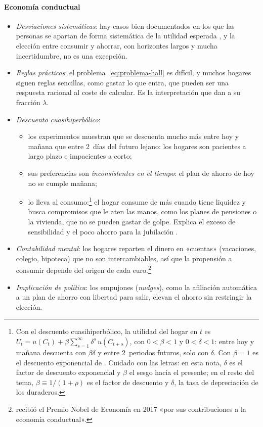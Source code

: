 \documentclass[11pt]{article}
\begin{document}
\paragraph{Economía conductual}

\begin{itemize}
\item \emph{Desviaciones sistemáticas}: hay casos bien documentados en los que las personas se apartan de forma sistemática de la utilidad esperada\nocite{KahnemanTversky1979Prospect} , y la elección entre consumir y ahorrar, con horizontes largos y mucha incertidumbre, no es una excepción.
\item \emph{Reglas prácticas}: el problema~\eqref{eq:problema-hall} es difícil, y muchos hogares siguen reglas sencillas, como gastar lo que entra, que pueden ser una respuesta racional al coste de calcular. Es la interpretación que dan \textcite{CampbellMankiw1989Consumption} a su fracción $\lambda$.
\item \emph{Descuento cuasihiperbólico}:
  \begin{itemize}
  \item los experimentos muestran que se descuenta mucho más entre hoy y mañana que entre 2~días del futuro lejano\nocite{Thaler1981Some}: los hogares son pacientes a largo plazo e impacientes a corto;
  \item sus preferencias son \emph{inconsistentes en el tiempo}\nocite{Strotz1955Myopia}: el plan de ahorro de hoy no se cumple mañana;
  \item \textcite{Laibson1997Golden} lo lleva al consumo:\footnote{Con el descuento cuasihiperbólico, la utilidad del hogar en $t$ es $U_t=u(C_t)+\beta\sum_{s=1}^{\infty}\delta^s\,u(C_{t+s})$, con $0<\beta<1$ y $0<\delta<1$: entre hoy y mañana descuenta con $\beta\delta$ y entre 2~periodos futuros, solo con $\delta$. Con $\beta=1$ es el descuento exponencial de \textcite{Samuelson1937Note}. Cuidado con las letras: en esta nota, $\delta$ es el factor de descuento exponencial y $\beta$ el sesgo hacia el presente; en el resto del tema, $\beta\equiv 1/(1+\rho)$ es el factor de descuento y $\delta$, la tasa de depreciación de los duraderos.} el hogar consume de más cuando tiene liquidez y busca compromisos que le aten las manos, como los planes de pensiones o la vivienda, que no se pueden gastar de golpe. Explica el exceso de sensibilidad y el poco ahorro para la jubilación .
  \end{itemize}
\item \emph{Contabilidad mental}: los hogares reparten el dinero en «cuentas» (vacaciones, colegio, hipoteca) que no son intercambiables, así que la propensión a consumir depende del origen de cada euro\nocite{Thaler1985Mental,ShefrinThaler1988}.\footnote{ recibió el Premio Nobel de Economía en 2017 «por sus contribuciones a la economía conductual»\nocite{Nobel2017Thaler}.}
\item \emph{Implicación de política}: los empujones (\emph{nudges}), como la afiliación automática a un plan de ahorro con libertad para salir, elevan el ahorro sin restringir la elección.
\end{itemize}
\end{document}
